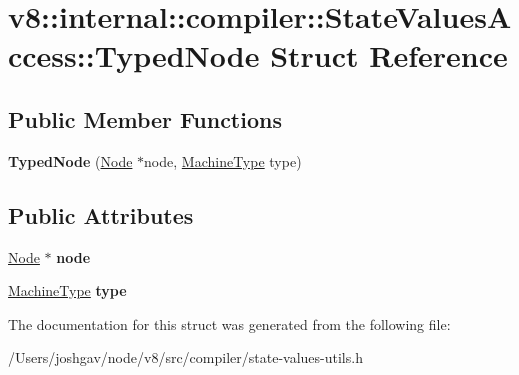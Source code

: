 \hypertarget{structv8_1_1internal_1_1compiler_1_1_state_values_access_1_1_typed_node}{}\section{v8\+:\+:internal\+:\+:compiler\+:\+:State\+Values\+Access\+:\+:Typed\+Node Struct Reference}
\label{structv8_1_1internal_1_1compiler_1_1_state_values_access_1_1_typed_node}
\subsection*{Public Member Functions}
\begin{DoxyCompactItemize}
\item 
{\bfseries Typed\+Node} (\hyperlink{classv8_1_1internal_1_1compiler_1_1_node}{Node} $\ast$node, \hyperlink{classv8_1_1internal_1_1_machine_type}{Machine\+Type} type)\hypertarget{structv8_1_1internal_1_1compiler_1_1_state_values_access_1_1_typed_node_a4a6a66a7c3644db0f7cb2a45271911b1}{}\label{structv8_1_1internal_1_1compiler_1_1_state_values_access_1_1_typed_node_a4a6a66a7c3644db0f7cb2a45271911b1}

\end{DoxyCompactItemize}
\subsection*{Public Attributes}
\begin{DoxyCompactItemize}
\item 
\hyperlink{classv8_1_1internal_1_1compiler_1_1_node}{Node} $\ast$ {\bfseries node}\hypertarget{structv8_1_1internal_1_1compiler_1_1_state_values_access_1_1_typed_node_a467721b9e4b7687c84e05d086fdd606e}{}\label{structv8_1_1internal_1_1compiler_1_1_state_values_access_1_1_typed_node_a467721b9e4b7687c84e05d086fdd606e}

\item 
\hyperlink{classv8_1_1internal_1_1_machine_type}{Machine\+Type} {\bfseries type}\hypertarget{structv8_1_1internal_1_1compiler_1_1_state_values_access_1_1_typed_node_a5666d30f4ebc578f55d7e787736c8ba4}{}\label{structv8_1_1internal_1_1compiler_1_1_state_values_access_1_1_typed_node_a5666d30f4ebc578f55d7e787736c8ba4}

\end{DoxyCompactItemize}


The documentation for this struct was generated from the following file\+:\begin{DoxyCompactItemize}
\item 
/\+Users/joshgav/node/v8/src/compiler/state-\/values-\/utils.\+h\end{DoxyCompactItemize}
